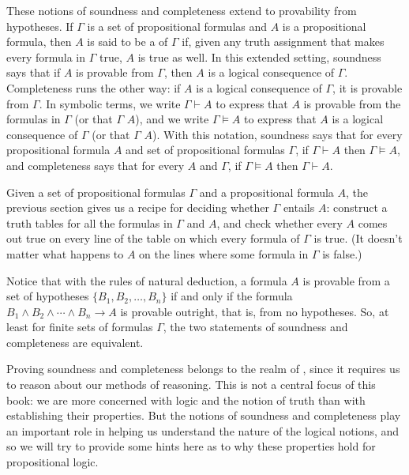 \documentclass[letterpaper,10pt,english]{sphinxmanual}
\begin{document}
\sphinxAtStartPar
These notions of soundness and completeness extend to provability from hypotheses. If \(\Gamma\) is a set of propositional formulas and \(A\) is a propositional formula, then \(A\) is said to be a  of \(\Gamma\) if, given any truth assignment that makes every formula in \(\Gamma\) true, \(A\) is true as well. In this extended setting, soundness says that if \(A\) is provable from \(\Gamma\), then \(A\) is a logical consequence of \(\Gamma\). Completeness runs the other way: if \(A\) is a logical consequence of \(\Gamma\), it is provable from \(\Gamma\). In symbolic terms, we write \(\Gamma \vdash A\) to express that \(A\) is provable from the formulas in \(\Gamma\) (or that \(\Gamma\)  \(A\)), and we write \(\Gamma \vDash A\) to express that \(A\) is a logical consequence of \(\Gamma\) (or that \(\Gamma\)  \(A\)). With this notation, soundness says that for every propositional formula \(A\) and set of propositional formulas \(\Gamma\), if \(\Gamma \vdash A\) then \(\Gamma \vDash A\), and completeness says that for every \(A\) and \(\Gamma\), if \(\Gamma \vDash A\) then \(\Gamma \vdash A\).

\sphinxAtStartPar
Given a set of propositional formulas \(\Gamma\) and a propositional formula \(A\), the previous section gives us a recipe for deciding whether \(\Gamma\) entails \(A\): construct a truth tables for all the formulas in \(\Gamma\) and \(A\), and check whether every \(A\) comes out true on every line of the table on which every formula of \(\Gamma\) is true. (It doesn’t matter what happens to \(A\) on the lines where some formula in \(\Gamma\) is false.)

\sphinxAtStartPar
Notice that with the rules of natural deduction, a formula \(A\) is provable from a set of hypotheses \(\{ B_1, B_2, \ldots, B_n \}\) if and only if the formula \(B_1 \wedge B_2 \wedge \cdots \wedge B_n \to A\) is provable outright, that is, from no hypotheses. So, at least for finite sets of formulas \(\Gamma\), the two statements of soundness and completeness are equivalent.

\sphinxAtStartPar
Proving soundness and completeness belongs to the realm of , since it requires us to reason about our methods of reasoning. This is not a central focus of this book: we are more concerned with  logic and the notion of truth than with establishing their properties. But the notions of soundness and completeness play an important role in helping us understand the nature of the logical notions, and so we will try to provide some hints here as to why these properties hold for propositional logic.
\end{document}
